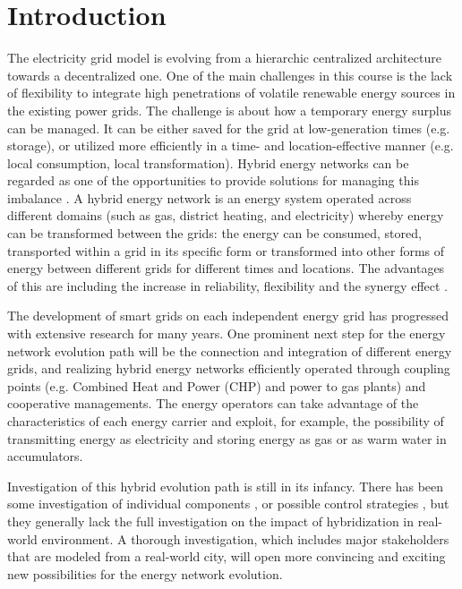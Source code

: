 \documentclass[review]{elsarticle}
\begin{document}
\linenumbers

\section{Introduction}
The electricity grid model is evolving from a hierarchic centralized
architecture towards a decentralized one. One of the main challenges 
in this course is the lack of flexibility to integrate high
penetrations of volatile renewable energy sources in the existing
power grids.  
The challenge is about how a temporary energy surplus can be
managed. It can be either saved for the grid at low-generation 
times (e.g. storage), or utilized more efficiently in a time- and
location-effective manner (e.g. local consumption, local
transformation).   
Hybrid energy networks can be regarded as one of the opportunities to  
provide solutions for managing this imbalance \cite{appelrath_2012,lehnhoff2013ict}.  
A hybrid energy network is an energy system operated across
different domains (such as gas, district heating, and electricity)
whereby energy can be transformed between the grids: the energy can be
consumed, stored, transported within a grid in its specific form or
transformed into other forms of energy between different grids for
different times and locations. 
The advantages of this are including the increase in reliability,
flexibility and the synergy effect \cite{arnold_2011}.

The development of smart grids on each independent energy grid has
progressed with extensive research for many years. One prominent next
step for the energy network evolution path will be the connection and
integration of different energy grids, and realizing hybrid energy
networks efficiently operated through coupling points (e.g. Combined
Heat and Power (CHP) and power to gas plants) and cooperative
managements. 
The energy operators can take advantage of the characteristics of each  
energy carrier and exploit, for example, the possibility of
transmitting energy as electricity and storing energy as gas or as 
warm water in accumulators.  

Investigation of this hybrid evolution path is still in its
infancy. There has been some investigation of individual components \cite{keirstead_2012,Derksen_2012}, or possible control
strategies \cite{arnold_2009}, but they generally lack the full
investigation on the impact of hybridization in real-world
environment. A thorough investigation, which includes major
stakeholders that are modeled from a real-world city, will open more
convincing and exciting new possibilities for the energy network
evolution.
\end{document}

